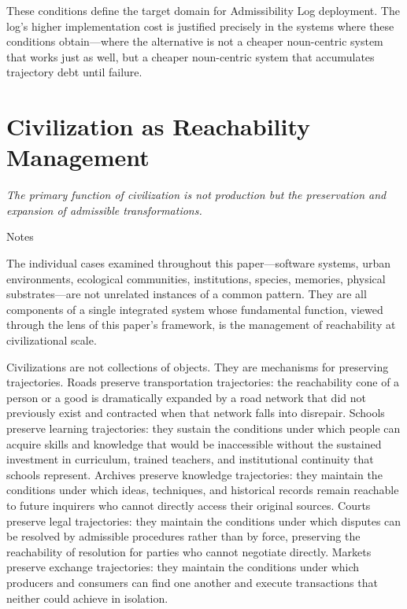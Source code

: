 \documentclass[12pt, a4paper]{article}
\theoremstyle{plain}
\theoremstyle{definition}
\theoremstyle{remark}
\begin{document}
These conditions define the target domain for Admissibility Log deployment.
The log's higher implementation cost is justified precisely in the systems
where these conditions obtain---where the alternative is not a cheaper
noun-centric system that works just as well, but a cheaper noun-centric system
that accumulates trajectory debt until failure.

\section{Civilization as Reachability Management}
\label{sec:civilization}

\epigraph{\textit{The primary function of civilization is not production but
the preservation and expansion of admissible transformations.}}{Notes}

\noindent
The individual cases examined throughout this paper---software systems,
urban environments, ecological communities, institutions, species, memories,
physical substrates---are not unrelated instances of a common pattern.
They are all components of a single integrated system whose fundamental
function, viewed through the lens of this paper's framework, is the
management of reachability at civilizational scale.

Civilizations are not collections of objects. They are mechanisms for
preserving trajectories. Roads preserve transportation trajectories:
the reachability cone of a person or a good is dramatically expanded
by a road network that did not previously exist and contracted when that
network falls into disrepair. Schools preserve learning trajectories:
they sustain the conditions under which people can acquire skills and
knowledge that would be inaccessible without the sustained investment in
curriculum, trained teachers, and institutional continuity that schools
represent. Archives preserve knowledge trajectories: they maintain the
conditions under which ideas, techniques, and historical records remain
reachable to future inquirers who cannot directly access their original
sources. Courts preserve legal trajectories: they maintain the conditions
under which disputes can be resolved by admissible procedures rather than
by force, preserving the reachability of resolution for parties who cannot
negotiate directly. Markets preserve exchange trajectories: they maintain
the conditions under which producers and consumers can find one another
and execute transactions that neither could achieve in isolation.
\end{document}

